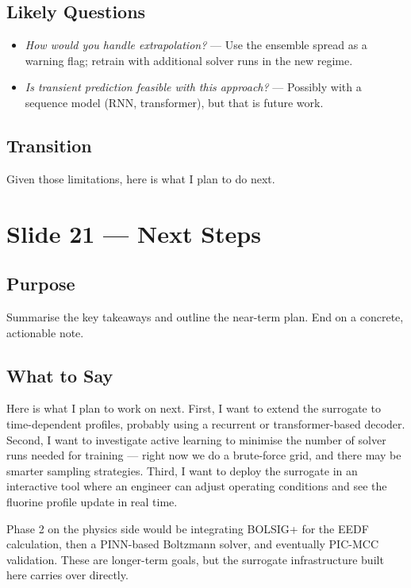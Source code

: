 \documentclass[12pt,a4paper]{article}
\begin{document}
\subsection*{Likely Questions}
\begin{itemize}
  \item \emph{How would you handle extrapolation?}
    --- Use the ensemble spread as a warning flag; retrain with
    additional solver runs in the new regime.
  \item \emph{Is transient prediction feasible with this approach?}
    --- Possibly with a sequence model (RNN, transformer), but that
    is future work.
\end{itemize}

\subsection*{Transition}
Given those limitations, here is what I plan to do next.

\clearpage

\section{Slide 21 --- Next Steps}
\label{sec:slide21}

\subsection*{Purpose}
Summarise the key takeaways and outline the near-term plan. End
on a concrete, actionable note.

\subsection*{What to Say}

Here is what I plan to work on next.  First, I want to extend the
surrogate to time-dependent profiles, probably using a recurrent or
transformer-based decoder.  Second, I want to investigate active
learning to minimise the number of solver runs needed for
training --- right now we do a brute-force grid, and there may be
smarter sampling strategies.  Third, I want to deploy the surrogate
in an interactive tool where an engineer can adjust operating
conditions and see the fluorine profile update in real time.

Phase 2 on the physics side would be integrating BOLSIG+ for the
EEDF calculation, then a PINN-based Boltzmann solver, and eventually
PIC-MCC validation.  These are longer-term goals, but the surrogate
infrastructure built here carries over directly.
\end{document}

